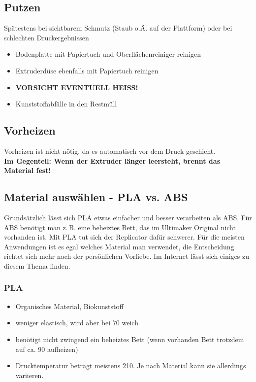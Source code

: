 \documentclass{\basedir/fablab-document}
\begin{document}
\subsection{Putzen} \label{putzen}

Spätestens bei sichtbarem Schmutz (Staub o.Ä. auf der Plattform) oder bei schlechten Druckergebnissen

\begin{itemize}
 \item Bodenplatte mit Papiertuch und Oberflächenreiniger reinigen
 \item Extruderdüse ebenfalls mit Papiertuch reinigen
 \item \textbf{VORSICHT EVENTUELL HEISS!}
 \item Kunststoffabfälle in den Restmüll
\end{itemize}

\subsection{Vorheizen}
Vorheizen ist nicht nötig, da es automatisch vor dem Druck geschieht.\\
\textbf{Im Gegenteil: Wenn der Extruder länger leersteht, brennt das Material fest!}

\subsection{Material auswählen - PLA vs. ABS}
Grundsätzlich lässt sich PLA etwas einfacher und besser verarbeiten als ABS. Für ABS benötigt man z.\,B. eine beheiztes
Bett, das im Ultimaker Original nicht vorhanden ist. Mit PLA tut sich der Replicator dafür schwerer. Für die meisten
Anwendungen ist es egal welches Material man verwendet, die Entscheidung richtet sich mehr nach der persönlichen
Vorliebe. Im Internet lässt sich einiges zu diesem Thema finden.

\subsubsection{PLA}
\begin{itemize}
\item Organisches Material, Biokunststoff
\item weniger elastisch, wird aber bei 70\textcelsius{} weich
\item benötigt nicht zwingend ein beheiztes Bett (wenn vorhanden Bett trotzdem auf ca. 90\textcelsius{} aufheizen)
\item Drucktemperatur beträgt meistens 210\textcelsius{}. Je nach Material kann sie allerdings variieren.
\end{itemize}
\end{document}
